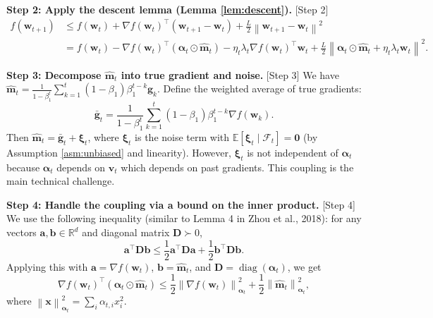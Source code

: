 \documentclass{article}
\theoremstyle{plain}
\theoremstyle{definition}
\DeclareMathOperator{\diag}{diag}
\renewcommand{\vec}[1]{\boldsymbol{#1}}
\newcommand{\norm}[1]{\left\| #1 \right\|}
\newcommand{\expect}[1]{\mathbb{E}\left[ #1 \right]}
\newcommand{\R}{\mathbb{R}}
\begin{document}
\textbf{Step 2: Apply the descent lemma (Lemma \ref{lem:descent}).} [Step 2]
\begin{align}
    f(\vec{w}_{t+1}) &\le f(\vec{w}_t) + \nabla f(\vec{w}_t)^\top (\vec{w}_{t+1} - \vec{w}_t) + \frac{L}{2} \norm{\vec{w}_{t+1} - \vec{w}_t}^2 \\
    &= f(\vec{w}_t) - \nabla f(\vec{w}_t)^\top (\vec{\alpha}_t \odot \hat{\vec{m}}_t) - \eta_t \lambda_t \nabla f(\vec{w}_t)^\top \vec{w}_t + \frac{L}{2} \norm{\vec{\alpha}_t \odot \hat{\vec{m}}_t + \eta_t \lambda_t \vec{w}_t}^2. \label{eq:descent_expanded}
\end{align}

\textbf{Step 3: Decompose $\hat{\vec{m}}_t$ into true gradient and noise.} [Step 3]
We have $\hat{\vec{m}}_t = \frac{1}{1-\beta_1^t} \sum_{k=1}^t (1-\beta_1) \beta_1^{t-k} \vec{g}_k$. Define the weighted average of true gradients:
\begin{equation}
    \vec{\bar{g}}_t = \frac{1}{1-\beta_1^t} \sum_{k=1}^t (1-\beta_1) \beta_1^{t-k} \nabla f(\vec{w}_k).
\end{equation}
Then $\hat{\vec{m}}_t = \vec{\bar{g}}_t + \vec{\xi}_t$, where $\vec{\xi}_t$ is the noise term with $\expect{\vec{\xi}_t \mid \mathcal{F}_t} = \vec{0}$ (by Assumption \ref{asm:unbiased} and linearity). However, $\vec{\xi}_t$ is not independent of $\vec{\alpha}_t$ because $\vec{\alpha}_t$ depends on $\vec{v}_t$ which depends on past gradients. This coupling is the main technical challenge.

\textbf{Step 4: Handle the coupling via a bound on the inner product.} [Step 4]
We use the following inequality (similar to Lemma 4 in Zhou et al., 2018): for any vectors $\vec{a}, \vec{b} \in \R^d$ and diagonal matrix $\vec{D} \succ 0$,
\begin{equation}
    \vec{a}^\top \vec{D} \vec{b} \le \frac{1}{2} \vec{a}^\top \vec{D} \vec{a} + \frac{1}{2} \vec{b}^\top \vec{D} \vec{b}.
\end{equation}
Applying this with $\vec{a} = \nabla f(\vec{w}_t)$, $\vec{b} = \hat{\vec{m}}_t$, and $\vec{D} = \diag(\vec{\alpha}_t)$, we get
\begin{equation}
    \nabla f(\vec{w}_t)^\top (\vec{\alpha}_t \odot \hat{\vec{m}}_t) \le \frac{1}{2} \norm{\nabla f(\vec{w}_t)}_{\vec{\alpha}_t}^2 + \frac{1}{2} \norm{\hat{\vec{m}}_t}_{\vec{\alpha}_t}^2, \label{eq:inner_bound}
\end{equation}
where $\norm{\vec{x}}_{\vec{\alpha}_t}^2 = \sum_i \alpha_{t,i} x_i^2$.
\end{document}
